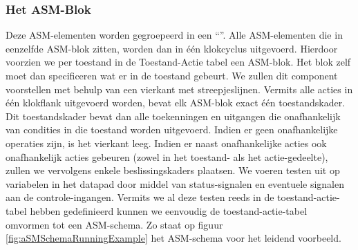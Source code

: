 \subsubsection{Het ASM-Blok}
Deze ASM-elementen worden gegroepeerd in een ``''. Alle ASM-elementen die in eenzelfde ASM-blok zitten, worden dan in \'e\'en klokcyclus uitgevoerd. Hierdoor voorzien we per toestand in de Toestand-Actie tabel een ASM-blok. Het blok zelf moet dan specificeren wat er in de toestand gebeurt. We zullen dit component voorstellen met behulp van een vierkant met streepjeslijnen. Vermits alle acties in \'e\'en klokflank uitgevoerd worden, bevat elk ASM-blok exact \'e\'en toestandskader. Dit toestandskader bevat dan alle toekenningen en uitgangen die onafhankelijk van condities in die toestand worden uitgevoerd. Indien er geen onafhankelijke operaties zijn, is het vierkant leeg. Indien er naast onafhankelijke acties ook onafhankelijk acties gebeuren (zowel in het toestand- als het actie-gedeelte), zullen we vervolgens enkele beslissingskaders plaatsen. We voeren testen uit op variabelen in het datapad door middel van status-signalen en eventuele signalen aan de controle-ingangen. Vermits we al deze
testen reeds in de toestand-actie-tabel hebben gedefinieerd kunnen we eenvoudig de toestand-actie-tabel omvormen tot een ASM-schema. Zo staat op figuur \ref{fig:aSMSchemaRunningExample} het ASM-schema voor het leidend voorbeeld.
